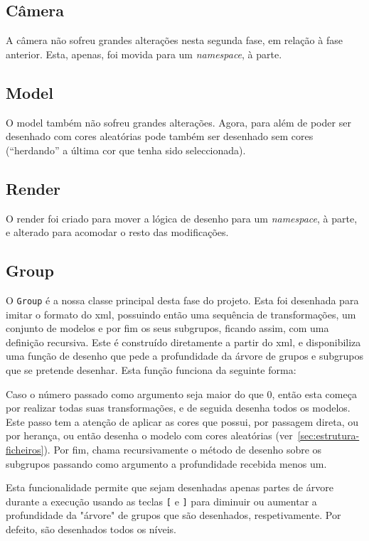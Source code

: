 \documentclass[a4paper]{article}
\begin{document}
\subsection{Câmera}

A câmera não sofreu grandes alterações nesta segunda fase, em relação à fase anterior. Esta, apenas, foi movida para um \textit{namespace}, à parte.

\subsection{Model}

O model também não sofreu grandes alterações. Agora, para além de poder ser desenhado com cores aleatórias pode também ser desenhado sem cores (``herdando'' a última cor que tenha sido seleccionada).

\subsection{Render}

O render foi criado para mover a lógica de desenho para um \textit{namespace}, à
parte, e alterado para acomodar o resto das modificações.

\subsection{Group}

O \texttt{Group} é a nossa classe principal desta fase do projeto. Esta foi
desenhada para imitar o formato do xml, possuindo então uma sequência de
transformações, um conjunto de modelos e por fim os seus subgrupos, ficando
assim, com uma definição recursiva. Este é construído diretamente a partir do
xml, e disponibiliza uma função de desenho que pede a profundidade da árvore
de grupos e subgrupos que se pretende desenhar. Esta função funciona da
seguinte forma:

Caso o número passado como argumento seja maior do que 0, então esta começa por realizar todas
suas transformações, e de seguida desenha todos os modelos. Este passo tem a
atenção de aplicar as cores que possui, por passagem direta, ou por herança,
ou então desenha o modelo com cores aleatórias
(ver~\ref{sec:estrutura-ficheiros}). Por fim, chama recursivamente o método de
desenho sobre os subgrupos passando como argumento a profundidade recebida menos um.

Esta funcionalidade permite que sejam desenhadas apenas partes de árvore durante a execução usando as teclas
\texttt{[} e \texttt{]} para diminuir ou aumentar a profundidade da "árvore" de grupos que são desenhados, respetivamente. Por defeito, são desenhados todos os níveis.
\end{document}

